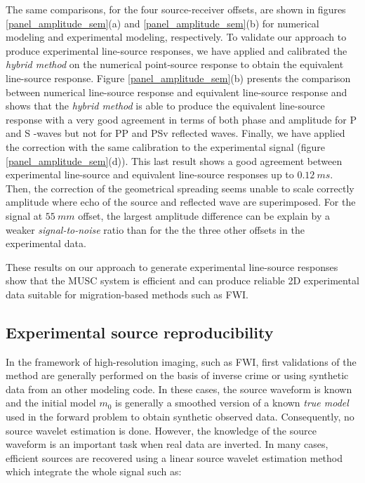 \documentclass[manuscript,revised]{geophysics}
\begin{document}
\noindent The same comparisons, for the four source-receiver offsets, are shown in figures \ref{panel_amplitude_sem}(a) and \ref{panel_amplitude_sem}(b) for numerical modeling and experimental modeling, respectively. To validate our approach to produce experimental line-source responses, we have applied and calibrated the \textit{hybrid method} \citep{Forbriger_LSS_2014,Schafer_LSS_2014} on the numerical point-source response to obtain the equivalent line-source response. Figure \ref{panel_amplitude_sem}(b) presents the comparison between numerical line-source response and equivalent line-source response and shows that the \textit{hybrid method} is able to produce the equivalent line-source response with a very good agreement in terms of both phase and amplitude for P and S -waves but not for PP and PSv reflected waves. Finally, we have applied the correction with the same calibration to the experimental signal (figure \ref{panel_amplitude_sem}(d)). This last result shows a good agreement between experimental line-source and equivalent line-source responses up to $0.12\ ms$. Then, the correction of the geometrical spreading seems unable to scale correctly amplitude where echo of the source and reflected wave are superimposed. For the signal at $55\ mm$ offset, the largest amplitude difference can be explain by a weaker \textit{signal-to-noise} ratio than for the the three other offsets in the experimental data.  

\noindent These results on our approach to generate experimental line-source responses show that the MUSC system is efficient and can produce reliable 2D experimental data suitable for migration-based methods such as FWI.


\subsection{Experimental source reproducibility}

\noindent In the framework of high-resolution imaging, such as FWI, first validations of the method are generally performed on the basis of inverse crime or using synthetic data from an other modeling code. In these cases, the source waveform is known and the initial model $m_{0}$ is generally a smoothed version of a known \textit{true model} used in the forward problem to obtain synthetic observed data. Consequently, no source wavelet estimation is done. However, the knowledge of the source waveform is an important task when real data are inverted. In many cases, efficient sources are recovered using a linear source wavelet estimation method  \citep{Pratt_FWI_1999} which integrate the whole signal such as:
\end{document}
